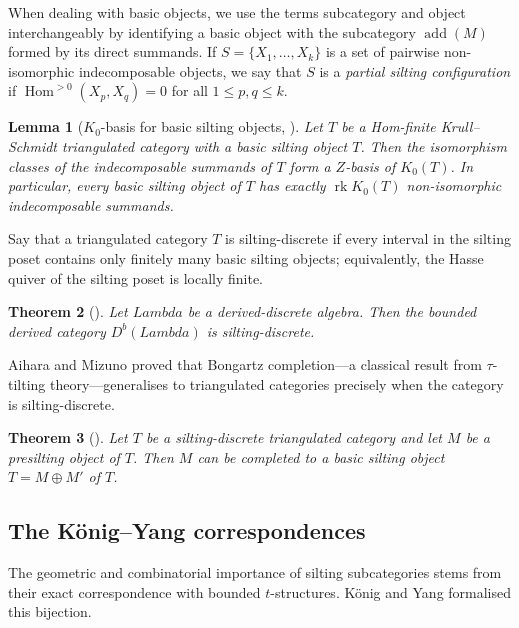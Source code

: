 \documentclass[11pt, a4paper]{article}
\newtheorem{theorem}{Theorem}[section]
\newtheorem{lemma}[theorem]{Lemma}
\theoremstyle{definition}
\def\Lambda{Lambda}%
\def\mathbb#1{#1}%
\def\mathcal#1{#1}%
\def\Db{D^b}%
\newcommand{\Db}{\mathcal{D}^b}
\begin{document}
When dealing with basic objects, we use the terms subcategory and object interchangeably by identifying a basic object with the subcategory $\operatorname{add}(M)$ formed by its direct summands. If $S = \{X_1, \ldots, X_k\}$ is a set of pairwise non-isomorphic indecomposable objects, we say that $S$ is a \emph{partial silting configuration} if $\operatorname{Hom}^{>0}(X_p, X_q) = 0$ for all $1 \le p, q \le k$.

\begin{lemma}[$K_0$-basis for basic silting objects, {\cite[Theorem~2.27]{AI2012}}]\label{lem:silting-basic}
Let $\mathcal T$ be a Hom-finite Krull--Schmidt triangulated category with a basic silting object $T$. Then the isomorphism classes of the indecomposable summands of $T$ form a $\mathbb Z$-basis of $K_0(\mathcal T)$. In particular, every basic silting object of $\mathcal T$ has exactly $\operatorname{rk}K_0(\mathcal T)$ non-isomorphic indecomposable summands.
\end{lemma}

Say that a triangulated category $\mathcal{T}$ is silting-discrete if every interval in the silting poset contains only finitely many basic silting objects; equivalently, the Hasse quiver of the silting poset is locally finite.

\begin{theorem}[{\cite[Appendix~A]{AH2024}}]\label{thm:AH}
Let $\Lambda$ be a derived-discrete algebra. Then the bounded derived category $\Db(\Lambda)$ is silting-discrete.
\end{theorem}

Aihara and Mizuno proved that Bongartz completion---a classical result from $\tau$-tilting theory---generalises to triangulated categories precisely when the category is silting-discrete.

\begin{theorem}[{\cite[Theorem~2.15]{AM2017}}]\label{thm:AM}
Let $\mathcal T$ be a silting-discrete triangulated category and let $M$ be a presilting object of $\mathcal T$. Then $M$ can be completed to a basic silting object $T = M\oplus M'$ of $\mathcal T$.
\end{theorem}

\subsection{The K\"onig--Yang correspondences}
\label{subsec:prelim-KY}

The geometric and combinatorial importance of silting subcategories stems from their exact correspondence with bounded $t$-structures. K\"onig and Yang formalised this bijection.
\end{document}
